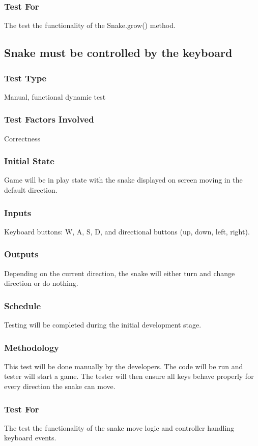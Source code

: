\documentclass[12pt]{article}
\begin{document}
\subsubsection*{Test For}
The test the functionality of the Snake.grow() method. \newline

\noindent
\subsection{Snake must be controlled by the keyboard}
\subsubsection*{Test Type}
Manual, functional dynamic test
\subsubsection*{Test Factors Involved}
Correctness
\subsubsection*{Initial State}
Game will be in play state with the snake displayed on screen moving in the default direction.
\subsubsection*{Inputs}
Keyboard buttons: W, A, S, D, and directional buttons (up, down, left, right). 
\subsubsection*{Outputs}
Depending on the current direction, the snake will either turn and change direction or do nothing.
\subsubsection*{Schedule}
Testing will be completed during the initial development stage.
\subsubsection*{Methodology}
This test will be done manually by the developers. The code will be run and tester will start a game. The tester will then ensure all keys behave properly for every direction the snake can move.
\subsubsection*{Test For}
The test the functionality of the snake move logic and controller handling keyboard events.\newline
\end{document}
